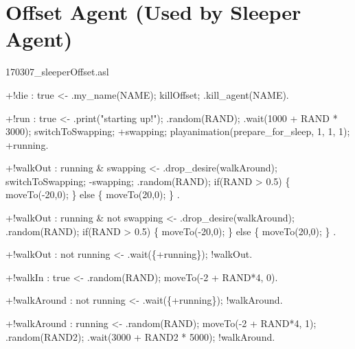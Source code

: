 \documentclass[draft,final]{vutinfth} %
\begin{document}
\normalsize
\section{Offset Agent (Used by Sleeper Agent)}
{\ttfamily\scriptsize\raggedright
170307\_sleeperOffset.asl

+!die : true
    <-  .my\_name(NAME);
        killOffset;
        .kill\_agent(NAME).

+!run : true
    <-  .print("starting up!");
        .random(RAND);
        .wait(1000 + RAND * 3000);
        switchToSwapping;
        +swapping;
        playanimation(prepare\_for\_sleep, 1, 1, 1);
        +running.

+!walkOut : running \& swapping
    <-  .drop\_desire(walkAround);
        switchToSwapping;
        -swapping;
        .random(RAND);
        if(RAND > 0.5)
        \{
            moveTo(-20,0);
        \}
        else
        \{
            moveTo(20,0);
        \}
        .

+!walkOut : running \& not swapping
    <-  .drop\_desire(walkAround);
        .random(RAND);
        if(RAND > 0.5)
        \{
            moveTo(-20,0);
        \}
        else
        \{
            moveTo(20,0);
        \}
        .

+!walkOut : not running
    <-  .wait(\{+running\});
        !walkOut.

+!walkIn : true
    <-  .random(RAND);
        moveTo(-2 + RAND*4, 0).

+!walkAround : not running
    <-  .wait(\{+running\});
        !walkAround.

+!walkAround : running
    <-  .random(RAND);
        moveTo(-2 + RAND*4, 1);
        .random(RAND2);
        .wait(3000 + RAND2 * 5000);
        !walkAround.
        
}

\normalsize
\end{document}
